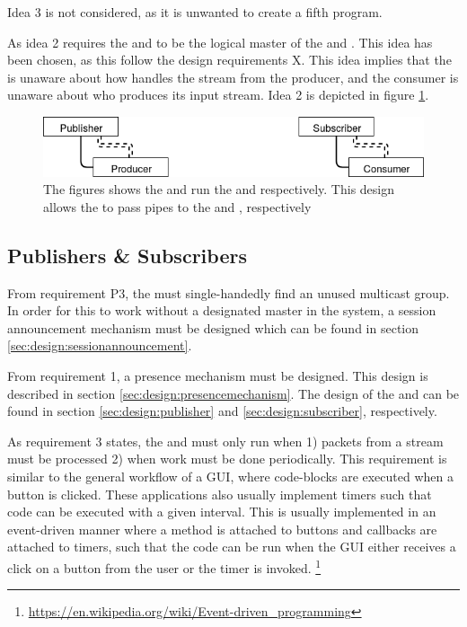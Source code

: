 Idea 3 is not considered, as it is unwanted to create a fifth program.

As idea 2 requires the \pubs{} and \subs{} to be the logical master of the \cons{} and \pros{}. This idea has been chosen, as this follow the design requirements X. This idea implies that the \pro{} is unaware about how handles the stream from the producer, and the consumer is unaware about who produces its input stream.  Idea 2 is depicted in figure \ref{fig:design:pubsub:runmode_master}.

\begin{figure}[H]
	\centering
	\includegraphics[width=1\textwidth]{figures/runmode_master}
	\caption{The figures shows the \pub{} and \sub{} run the \pro{} and \con{} respectively. This design allows the \pubs{} to pass pipes to the \pro{} and \con{}, respectively} \label{fig:design:pubsub:runmode_master}
\end{figure}

\subsection{Publishers \& Subscribers}
From requirement P3, the \pub{} must single-handedly find an unused multicast group. In order for this to work without a designated master in the system, a session announcement mechanism must be designed which can be found in section \ref{sec:design:sessionannouncement}.


\noindent From requirement 1, a presence mechanism must be designed. This design is described in section \ref{sec:design:presencemechanism}. The design of the \pubs{} and \subs{} can be found in section \ref{sec:design:publisher} and \ref{sec:design:subscriber}, respectively.

As requirement 3 states, the \pubs{} and \subs{} must only run when 1) packets from a stream must be processed  2) when work must be done periodically. This requirement is similar to the general workflow of a \ac{GUI}, where code-blocks are executed when a button is clicked. These applications also usually implement timers such that code can be executed with a given interval. This is usually implemented in an event-driven manner where a method is attached to buttons and callbacks are attached to timers, such that the code can be run when the GUI either receives a click on a button from the user or the timer is invoked. \footnote{\url{https://en.wikipedia.org/wiki/Event-driven_programming}}

